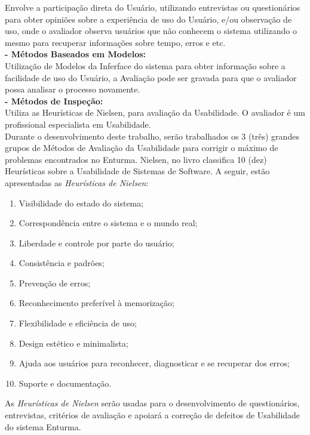 	Envolve a participação direta do Usuário, utilizando entrevistas ou questionários para obter opiniões sobre a experiência de uso do Usuário, e/ou observação de uso, onde o avaliador observa usuários que não conhecem o sistema utilizando o mesmo para recuperar informações sobre tempo, erros e etc. \\

\textbf{- Métodos Baseados em Modelos:}
	\\

	Utilização de Modelos da Inferface do sistema para obter informação sobre a facilidade de uso do Usuário, a Avaliação pode ser gravada para que o avaliador possa analisar o processo novamente. \\

\textbf{- Métodos de Inspeção:}
	\\

	Utiliza as Heurísticas de Nielsen, \cite{usabilidade_interfaces} para avaliação da Usabilidade. O avaliador é um profissional especialista em Usabilidade. \\

	Durante o desenvolvimento deste trabalho, serão trabalhados os 3 (três) grandes grupos de Métodos de Avaliação da Usabilidade para corrigir o máximo de problemas encontrados no Enturma. Nielsen, no livro \cite{usabilidade_web} classifica 10 (dez) Heurísticas sobre a Usabilidade de Sistemas de Software. A seguir, estão apresentadas as \textit{Heurísticas de Nielsen}:

\begin{enumerate}
  \item Visibilidade do estado do sistema;
  \item Correspondência entre o sistema e o mundo real;
  \item Liberdade e controle por parte do usuário;
  \item Consistência e padrões;
  \item Prevenção de erros;
  \item Reconhecimento preferível à memorização;
  \item Flexibilidade e eficiência de uso;
  \item Design estético e minimalista;
  \item Ajuda aos usuários para reconhecer, diagnosticar e se recuperar dos erros;
  \item Suporte e documentação.
\end{enumerate}

	As \textit{Heurísticas de Nielsen} serão usadas para o desenvolvimento de questionários, entrevistas, critérios de avaliação e apoiará a correção de defeitos de Usabilidade do sistema Enturma.